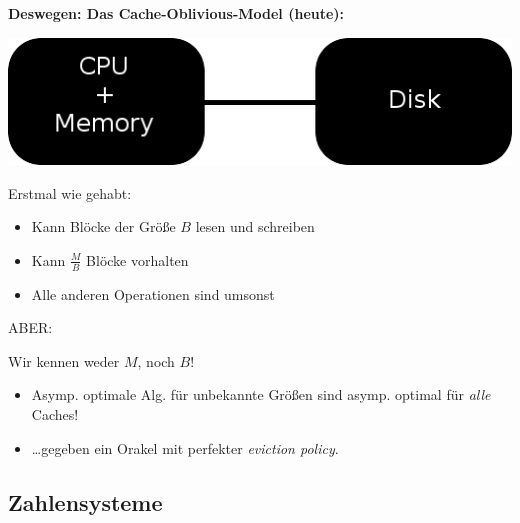 \documentclass{beamer}
\begin{document}

\begin{frame}
\textbf{Deswegen: Das Cache-Oblivious-Model (heute):}

\begin{center}
\includegraphics[scale=0.325]{model1.png} 
\end{center}
\pause

\begin{multicols}{2}
Erstmal wie gehabt:\smallskip\smallskip

\begin{itemize}
\item Kann Blöcke der Größe $B$ lesen und schreiben
\item Kann $\frac{M}{B}$ Blöcke vorhalten
\item Alle anderen Operationen sind \glqq umsonst\grqq
\end{itemize}

\columnbreak
\pause

ABER:

Wir kennen weder $M$, noch $B$! \smallskip\smallskip
\pause

\begin{itemize}
\item Asymp. optimale Alg. für unbekannte Größen sind asymp. optimal für \emph{alle} Caches!\pause
\item \dots gegeben ein Orakel mit perfekter \emph{eviction policy}.
\end{itemize}

\end{multicols}
\end{frame}

\subsection{Zahlensysteme}
\end{document}
